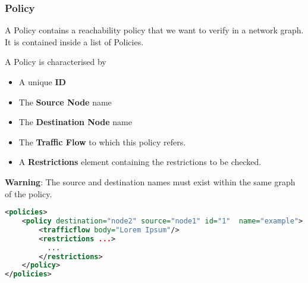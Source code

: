 \subsubsection*{Policy}
A Policy contains a reachability policy that we want to verify in a network graph. It is contained inside a list of Policies.

A Policy is characterised by
\begin{itemize}
 \item A unique \textbf{ID}
 \item The \textbf{Source Node} name
 \item The \textbf{Destination Node} name
 \item The \textbf{Traffic Flow} to which this policy refers.
 \item A \textbf{Restrictions} element containing the restrictions to be checked.
\end{itemize}

\begin{warning}
\textbf{Warning}: The source and destination names must exist within the same graph of the policy.
\end{warning}

\begin{lstlisting}[language=XML, caption=Policies Example]
<policies>
	<policy destination="node2" source="node1" id="1"  name="example">
		<trafficflow body="Lorem Ipsum"/>
		<restrictions ...>
	      ...
	    </restrictions>
	</policy>
</policies>
\end{lstlisting}

